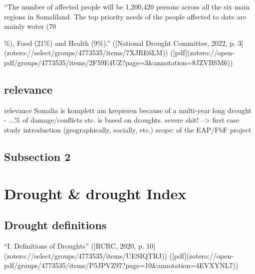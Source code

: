 “The number of affected people will be 1,200,420 persons across all the six main regions in Somaliland. The top priority needs of the people affected to date are mainly water (70{\%), Food (21\%) and Health (9\%).” ([National Drought Committee, 2022, p. 3](zotero://select/groups/4773535/items/7XJRE6LM)) ([pdf](zotero://open-pdf/groups/4773535/items/2F59E4UZ?page=3&annotation=8JZVBSM6))

\subsection{relevance}
relevance
Somalia is komplett am krepieren because of a multi-year long drought - ...\% of damage/conflicts etc. is based on droughts. severe shit! --> first case study introduction (geographically, socially, etc.) 
scope: of the EAP/FbF project

\subsection{Subsection 2}



\section{Drought & drought Index}


\subsection{Drought definitions}

“I. Definitions of Droughts” ([RCRC, 2020, p. 10](zotero://select/groups/4773535/items/UESIQTRJ)) ([pdf](zotero://open-pdf/groups/4773535/items/P5JPVZ97?page=10&annotation=4EVXYNL7))

}

